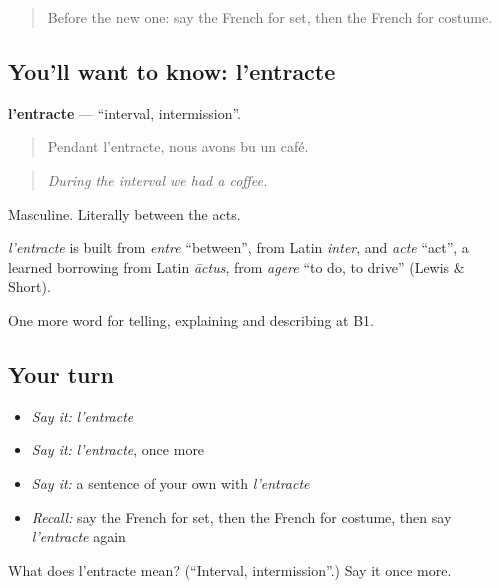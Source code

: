 \label{lesson:FR-C514-entracte}



\begin{quote}
Before the new one: say the French for set, then the French for costume.
\end{quote}

\subsection*{You'll want to know: l'entracte}
\textbf{l'entracte} — \textquotedblleft{}interval, intermission\textquotedblright{}.

\begin{quote}
Pendant l'entracte, nous avons bu un café.
\end{quote}

\begin{quote}
\emph{During the interval we had a coffee.}
\end{quote}

Masculine. Literally between the acts.

\begin{cousinweb}
\emph{l'entracte} is built from \emph{entre} \textquotedblleft{}between\textquotedblright{}, from Latin \emph{inter}, and \emph{acte} \textquotedblleft{}act\textquotedblright{}, a learned borrowing from Latin \emph{āctus}, from \emph{agere} \textquotedblleft{}to do, to drive\textquotedblright{} (Lewis \& Short).
\end{cousinweb}

\begin{grammarlens}[title={What you've built}]
One more word for telling, explaining and describing at B1.
\end{grammarlens}

\subsection*{Your turn}
\begin{itemize}
\raggedright
  \item \emph{Say it:} \emph{l'entracte}
  \item \emph{Say it:} \emph{l'entracte}, once more
  \item \emph{Say it:} a sentence of your own with \emph{l'entracte}
  \item \emph{Recall:} say the French for set, then the French for costume, then say \emph{l'entracte} again
\end{itemize}

\begin{tcolorbox}[breakable,colback=teal!4,colframe=teal!35!black,title={Before you move on}]
What does l'entracte mean? (\textquotedblleft{}Interval, intermission\textquotedblright{}.) Say it once more.
\end{tcolorbox}

